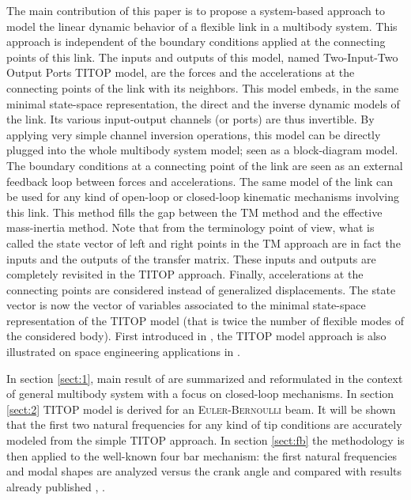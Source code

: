 The main contribution of this paper is to propose a system-based approach to model the linear dynamic behavior of a flexible link in a multibody system. This approach is independent of the boundary conditions applied at the connecting points of this link. The inputs and outputs of this model, named Two-Input-Two Output Ports TITOP model, are the  forces and the accelerations at the connecting points of the link with its neighbors. This model embeds, in the same minimal state-space representation, the direct and the inverse dynamic models of the link. Its various input-output channels (or ports) are thus invertible. By applying very simple channel inversion operations, this model can be directly plugged into the whole multibody system model; seen as a block-diagram model. The boundary conditions at a connecting point of the link are seen as an external feedback loop between forces and accelerations. The same model of the link can be used for any kind of open-loop or closed-loop kinematic mechanisms involving this link. This method fills the gap between the TM method and the effective mass-inertia method. Note that from the terminology point of view, what is called the state vector of left and right points in the TM approach are in fact the inputs and the outputs of the transfer matrix. These inputs and outputs are completely revisited in the TITOP approach. Finally, accelerations at the connecting points are considered instead of generalized displacements. The state vector is now the vector of variables associated to the minimal state-space representation of the TITOP model (that is twice the number of flexible modes of the considered body). First introduced in \cite{Alazard2015}, the TITOP model approach is also illustrated on space engineering applications in \cite{Murali2015,Perez2015,PEREZ2015275,Perez2015_LM}.

In section \ref{sect:1}, main result of \cite{Alazard2015} are summarized and reformulated in the context of general multibody system with a focus on closed-loop mechanisms. In section \ref{sect:2} TITOP model is derived for an \textsc{Euler-Bernoulli} beam. It will be shown that the first two natural frequencies for any kind of tip conditions are accurately modeled from the simple TITOP approach. In section \ref{sect:fb} the methodology is then applied to the well-known four bar mechanism: the first natural frequencies and modal shapes are analyzed versus the crank angle and compared with results already published \cite{Kitis1990267}, \cite{Turcic1984}. 

